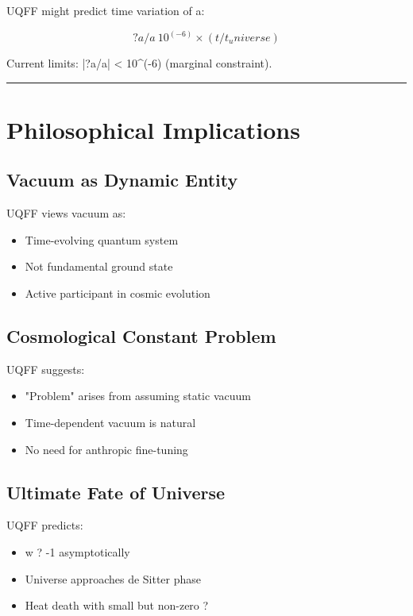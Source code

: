 \documentclass[12pt,a4paper]{article}
\begin{document}
UQFF might predict time variation of a:

\begin{equation}
?a/a ~ 10^(-6) \times (t/t_universe)
\end{equation}

Current limits: |?a/a| < 10\^{}(-6) (marginal constraint).

\medskip\hrule\medskip

\section{Philosophical Implications}

\subsection{Vacuum as Dynamic Entity}

UQFF views vacuum as:

\begin{itemize}
  \item Time-evolving quantum system
  \item Not fundamental ground state
  \item Active participant in cosmic evolution
\end{itemize}

\subsection{Cosmological Constant Problem}

UQFF suggests:

\begin{itemize}
  \item "Problem" arises from assuming static vacuum
  \item Time-dependent vacuum is natural
  \item No need for anthropic fine-tuning
\end{itemize}

\subsection{Ultimate Fate of Universe}

UQFF predicts:

\begin{itemize}
  \item w ? -1 asymptotically
  \item Universe approaches de Sitter phase
  \item Heat death with small but non-zero ?
\end{itemize}
\end{document}
